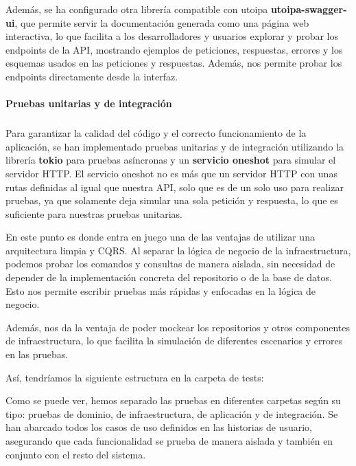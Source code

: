 Además, se ha configurado otra librería compatible con utoipa \textbf{utoipa-swagger-ui}, que permite servir la documentación generada como una página web interactiva, lo que facilita a los desarrolladores y usuarios explorar y probar los endpoints de la API, mostrando ejemplos de peticiones, respuestas, errores y los esquemas usados en las peticiones y respuestas.
Además, nos permite probar los endpoints directamente desde la interfaz.

\paragraph{Pruebas unitarias y de integración}
\subparagraph{}

Para garantizar la calidad del código y el correcto funcionamiento de la aplicación, se han implementado pruebas unitarias y de integración utilizando la librería \textbf{tokio} para pruebas asíncronas y un \textbf{servicio oneshot} para simular el servidor HTTP.
El servicio oneshot no es más que un servidor HTTP con unas rutas definidas al igual que nuestra API, solo que es de un solo uso para realizar pruebas, ya que solamente deja simular una sola petición y respuesta, lo que es suficiente para nuestras pruebas unitarias.

En este punto es donde entra en juego una de las ventajas de utilizar una arquitectura limpia y CQRS.
Al separar la lógica de negocio de la infraestructura, podemos probar los comandos y consultas de manera aislada, sin necesidad de depender de la implementación concreta del repositorio o de la base de datos. Esto nos permite escribir pruebas más rápidas y enfocadas en la lógica de negocio.

Además, nos da la ventaja de poder \gls{mockear} los repositorios y otros componentes de infraestructura, lo que facilita la simulación de diferentes escenarios y errores en las pruebas.

Así, tendríamos la siguiente estructura en la carpeta de tests:


Como se puede ver, hemos separado las pruebas en diferentes carpetas según su tipo: pruebas de dominio, de infraestructura, de aplicación y de integración.
Se han abarcado todos los casos de uso definidos en las historias de usuario, asegurando que cada funcionalidad se prueba de manera aislada y también en conjunto con el resto del sistema.

